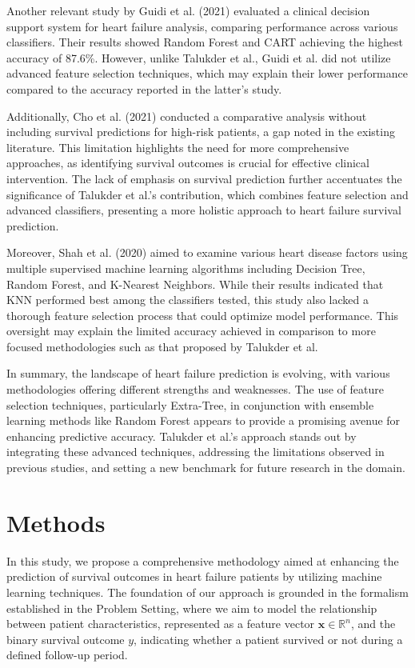 \documentclass{article}
\begin{document}
Another relevant study by Guidi et al. (2021) evaluated a clinical decision support system for heart failure analysis, comparing performance across various classifiers. Their results showed Random Forest and CART achieving the highest accuracy of 87.6\%. However, unlike Talukder et al., Guidi et al. did not utilize advanced feature selection techniques, which may explain their lower performance compared to the accuracy reported in the latter's study.

Additionally, Cho et al. (2021) conducted a comparative analysis without including survival predictions for high-risk patients, a gap noted in the existing literature. This limitation highlights the need for more comprehensive approaches, as identifying survival outcomes is crucial for effective clinical intervention. The lack of emphasis on survival prediction further accentuates the significance of Talukder et al.'s contribution, which combines feature selection and advanced classifiers, presenting a more holistic approach to heart failure survival prediction.

Moreover, Shah et al. (2020) aimed to examine various heart disease factors using multiple supervised machine learning algorithms including Decision Tree, Random Forest, and K-Nearest Neighbors. While their results indicated that KNN performed best among the classifiers tested, this study also lacked a thorough feature selection process that could optimize model performance. This oversight may explain the limited accuracy achieved in comparison to more focused methodologies such as that proposed by Talukder et al.

In summary, the landscape of heart failure prediction is evolving, with various methodologies offering different strengths and weaknesses. The use of feature selection techniques, particularly Extra-Tree, in conjunction with ensemble learning methods like Random Forest appears to provide a promising avenue for enhancing predictive accuracy. Talukder et al.’s approach stands out by integrating these advanced techniques, addressing the limitations observed in previous studies, and setting a new benchmark for future research in the domain.

\section{Methods}
In this study, we propose a comprehensive methodology aimed at enhancing the prediction of survival outcomes in heart failure patients by utilizing machine learning techniques. The foundation of our approach is grounded in the formalism established in the Problem Setting, where we aim to model the relationship between patient characteristics, represented as a feature vector \( \mathbf{x} \in \mathbb{R}^n \), and the binary survival outcome \( y \), indicating whether a patient survived or not during a defined follow-up period.
\end{document}

